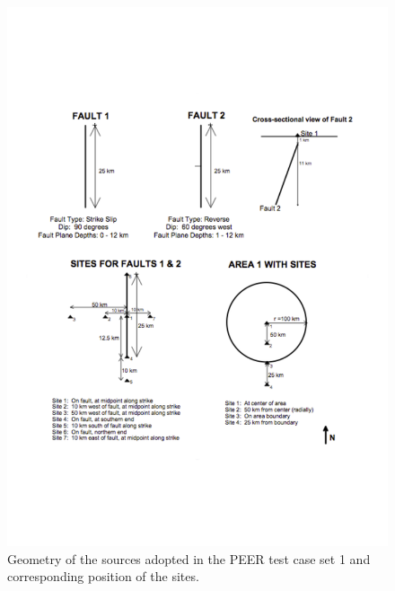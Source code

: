 \begin{figure}[!ht]
\centering
\includegraphics[trim=40mm 5mm 5mm 40mm, clip,width=12cm]{./Pictures/qa/peer_tests.pdf}
\caption{Geometry of the sources adopted in the PEER test case set 1 and
    corresponding position of the sites.}
\label{fig:peer_sources}
\end{figure}
%

